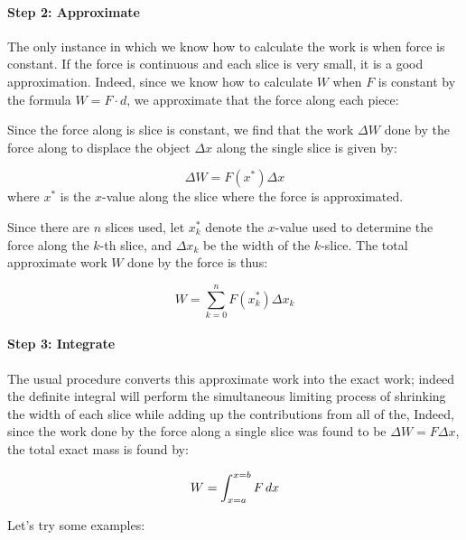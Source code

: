 \documentclass{ximera}
\begin{document}
\paragraph{Step 2: Approximate} The only instance in which we know how to calculate the work is when force is constant.  If the force is continuous and each slice is very small, it is a good approximation.  Indeed, since we know how to calculate $W$ when $F$ is constant by the formula $W=F\cdot d$, we approximate that the force along each piece:

\begin{multipleChoice}
\end{multipleChoice}

Since the force along is slice is constant, we find that the work $\Delta W$ done by the force along to displace the object $\Delta x$ along the single slice is given by: 

\[
\Delta W = F(x^*) \Delta x
\]
where $x^*$ is the $x$-value along the slice where the force is approximated.

Since there are $n$ slices used, let $x^*_k$ denote the $x$-value used to determine the force along the $k$-th slice, and $\Delta x_k$ be the width of the $k$-slice.  The total approximate work $W$ done by the force is thus:

\[
W = \sum_{k=0}^n F(x_k^*) \Delta x_k
\]

\paragraph{Step 3: Integrate}  The usual procedure converts this approximate work into the exact work; indeed the definite integral will perform the simultaneous limiting process of shrinking the width of each slice while adding up the contributions from all of the,  Indeed, since the work done by the force along a single slice was found to be $\Delta W =F \Delta x$, the total exact mass is found by:

\[
W = \int_{x=a}^{x=b} F \mathop{}\!d x
\]





Let's try some examples:
\end{document}
